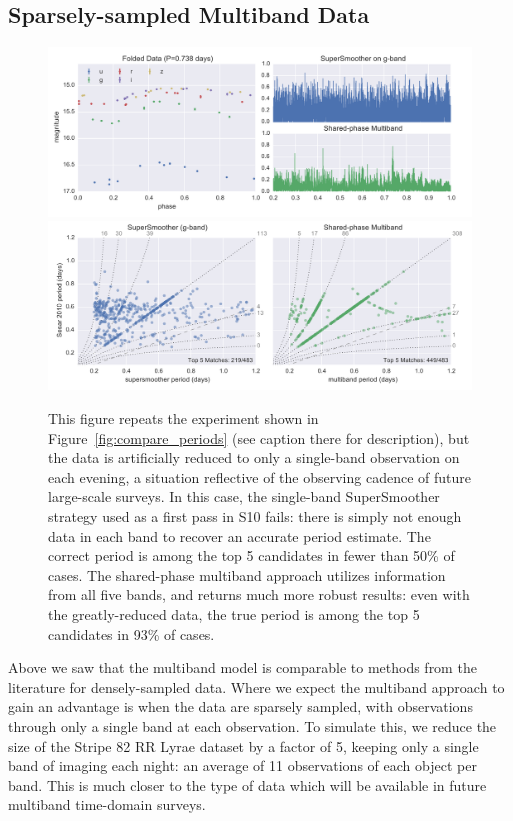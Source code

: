 \documentclass[12pt,preprint]{aastex}
\newcommand{\Fig}[1]{Figure~\ref{fig:#1}}
\newcommand{\fig}[1]{\Fig{#1}}
\newcommand{\figlabel}[1]{\label{fig:#1}}
\begin{document}
\subsection{Sparsely-sampled Multiband Data}

\begin{figure}
  \centering
  \includegraphics[width=\textwidth]{fig08a.pdf}
  \includegraphics[width=\textwidth]{fig08b.pdf}
  \caption{
    This figure repeats the experiment shown in \fig{compare_periods} (see caption there for description), but the data is artificially reduced to only a single-band observation on each evening, a situation reflective of the observing cadence of future large-scale surveys.
    In this case, the single-band SuperSmoother strategy used as a first pass in S10 fails: there is simply not enough data in each band to recover an accurate period estimate. The correct period is among the top 5 candidates in fewer than 50\% of cases.
    The shared-phase multiband approach utilizes information from all five bands, and returns much more robust results: even with the greatly-reduced data, the true period is among the top 5 candidates in 93\% of cases.
  } 
  \figlabel{compare_periods_reduced}
\end{figure}

Above we saw that the multiband model is comparable to methods from the literature for densely-sampled data. Where we expect the multiband approach to gain an advantage is when the data are sparsely sampled, with observations through only a single band at each observation. To simulate this, we reduce the size of the Stripe 82 RR Lyrae dataset by a factor of 5, keeping only a single band of imaging each night: an average of 11 observations of each object per band. This is much closer to the type of data which will be available in future multiband time-domain surveys.
\end{document}
